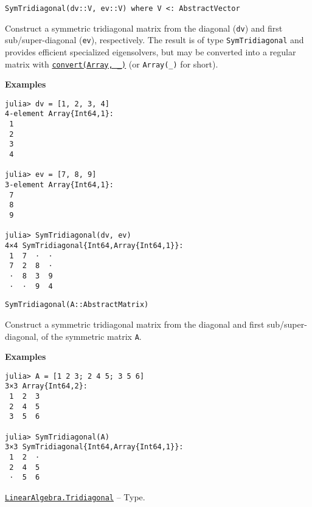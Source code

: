 \begin{adjustwidth}{2em}{0pt}


\begin{verbatim}
SymTridiagonal(dv::V, ev::V) where V <: AbstractVector
\end{verbatim}

Construct a symmetric tridiagonal matrix from the diagonal (\texttt{dv}) and first sub/super-diagonal (\texttt{ev}), respectively. The result is of type \texttt{SymTridiagonal} and provides efficient specialized eigensolvers, but may be converted into a regular matrix with \hyperlink{1846942650946171605}{\texttt{convert(Array, \_)}} (or \texttt{Array(\_)} for short).

\textbf{Examples}


\begin{verbatim}
julia> dv = [1, 2, 3, 4]
4-element Array{Int64,1}:
 1
 2
 3
 4

julia> ev = [7, 8, 9]
3-element Array{Int64,1}:
 7
 8
 9

julia> SymTridiagonal(dv, ev)
4×4 SymTridiagonal{Int64,Array{Int64,1}}:
 1  7  ⋅  ⋅
 7  2  8  ⋅
 ⋅  8  3  9
 ⋅  ⋅  9  4
\end{verbatim}




\begin{lstlisting}
SymTridiagonal(A::AbstractMatrix)
\end{lstlisting}

Construct a symmetric tridiagonal matrix from the diagonal and first sub/super-diagonal, of the symmetric matrix \texttt{A}.

\textbf{Examples}


\begin{verbatim}
julia> A = [1 2 3; 2 4 5; 3 5 6]
3×3 Array{Int64,2}:
 1  2  3
 2  4  5
 3  5  6

julia> SymTridiagonal(A)
3×3 SymTridiagonal{Int64,Array{Int64,1}}:
 1  2  ⋅
 2  4  5
 ⋅  5  6
\end{verbatim}



\end{adjustwidth}
\hypertarget{17820886359515748171}{} 
\hyperlink{17820886359515748171}{\texttt{LinearAlgebra.Tridiagonal}}  -- {Type.}

